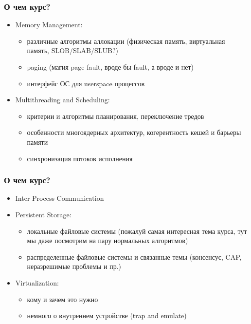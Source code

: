 \begin{frame}
\frametitle{О чем курс?}

\begin{itemize}
  \item<1-> Memory Management:

    \begin{itemize}
      \item различные алгоритмы аллокации (физическая память, виртуальная
            память, SLOB/SLAB/SLUB?)
      \item paging (магия page fault, вроде бы fault, а вроде и нет)
      \item интерфейс ОС для userspace процессов
    \end{itemize}

  \item<2> Multithreading and Scheduling:
    \begin{itemize}
      \item критерии и алгоритмы планирования, переключение тредов
      \item особенности многоядерных архитектур, когерентность кешей и барьеры
            памяти
      \item синхронизация потоков исполнения
    \end{itemize}
\end{itemize}

\end{frame}

\begin{frame}
\frametitle{О чем курс?}

\begin{itemize}
  \item<1-> Inter Process Communication

  \item<2-> Persistent Storage:
    \begin{itemize}
      \item локальные файловые системы (пожалуй самая интересная тема курса, тут
            мы даже посмотрим на пару нормальных алгоритмов)
      \item распределенные файловые системы и связанные темы (консенсус, CAP,
            неразрешимые проблемы и пр.)
    \end{itemize}

  \item<3> Virtualization:
    \begin{itemize}
      \item кому и зачем это нужно
      \item немного о внутреннем устройстве (trap and emulate)
    \end{itemize}

\end{itemize}

\end{frame}
